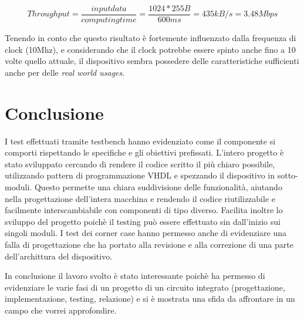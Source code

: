 \documentclass[a4paper]{report}
\begin{document}
\[
	Throughput = \frac{input data}{computing time} = \frac{1024 * 255B}{600ms} = 435kB/s = 3.48Mbps
\]

  Tenendo in conto che questo risultato è fortemente influenzato dalla frequenza di clock (10Mhz), e considerando che il clock potrebbe essere spinto anche fino a 10 volte quello attuale, il dispositivo sembra possedere delle caratteristiche sufficienti anche per delle \textit{real world usages}.


\chapter{Conclusione}
I test effettuati tramite testbench hanno evidenziato come il componente si comporti rispettando le specifiche e gli obiettivi prefissati.
L'intero progetto è stato sviluppato cercando di rendere il codice scritto il più chiaro possibile, utilizzando pattern di programmazione VHDL e spezzando il dispositivo in sotto-moduli. Questo permette una chiara suddivisione delle funzionalità, aiutando nella progettazione dell'intera macchina e rendendo il codice riutilizzabile e facilmente interscambiabile con componenti di tipo diverso. Facilita inoltre lo sviluppo del progetto poichè il testing può essere effettuato sin dall'inizio sui singoli moduli.
I test dei corner case hanno permesso anche di evidenziare una falla di progettazione che ha portato alla revisione e alla correzione di una parte dell'archittura del dispositivo.

In conclusione il lavoro svolto è stato interessante poichè ha permesso di evidenziare le varie fasi di un progetto di un circuito integrato (progettazione, implementazione, testing, relazione) e si è mostrata una sfida da affrontare in un campo che vorrei approfondire.
\end{document}
